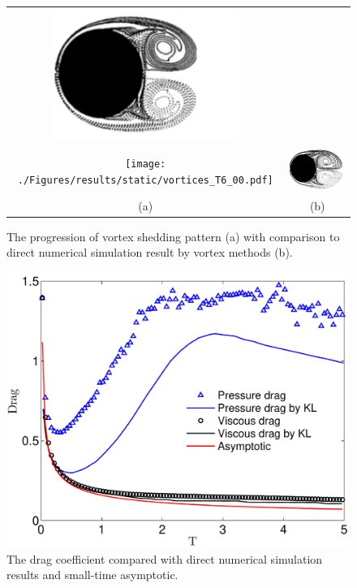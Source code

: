 \begin{figure}
\begin{center}
\begin{tabular}{cc}
 \includegraphics[width=6cm]{./Figures/results/static/KOU_Re1000_T4.png}  \\
 \texttt{[image: ./Figures/results/static/vortices\_T6\_00.pdf]}  &
 \includegraphics[width=6cm]{./Figures/results/static/KOU_Re1000_T6.png}  \\
 (a) & (b) \\
 \end{tabular}
\end{center}
 \caption[Vortex shedding pattern in the wake]{The progression of vortex shedding pattern (a) with comparison to direct numerical simulation result by vortex methods (b). }
 \label{fig:Wake}
\end{figure}

\begin{figure}
\begin{center}
\includegraphics[width=12cm]{./Figures/results/static/Drag.pdf}
\end{center}
\caption[Drag coefficient]{The drag coefficient compared with direct numerical simulation results and small-time asymptotic.}
\label{fig:Drag}
\end{figure}


